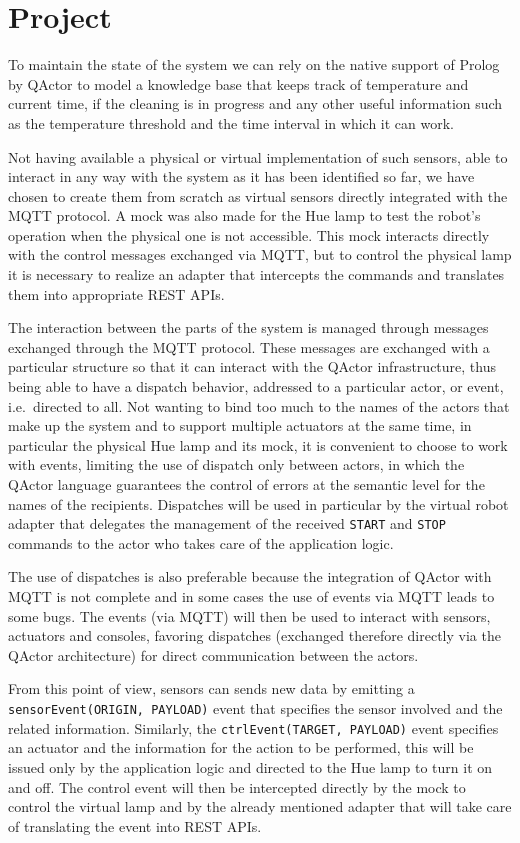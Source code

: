 \section{Project}
To maintain the state of the system we can rely on the native support of Prolog by QActor to model a knowledge base that keeps track of temperature and current time, if the cleaning is in progress and any other useful information such as the temperature threshold and the time interval in which it can work.

Not having available a physical or virtual implementation of such sensors, able to interact in any way with the system as it has been identified so far, we have chosen to create them from scratch as virtual sensors directly integrated with the MQTT protocol. A mock was also made for the Hue lamp to test the robot's operation when the physical one is not accessible. This mock interacts directly with the control messages exchanged via MQTT, but to control the physical lamp it is necessary to realize an adapter that intercepts the commands and translates them into appropriate REST APIs.

The interaction between the parts of the system is managed through messages exchanged through the MQTT protocol. These messages are exchanged with a particular structure so that it can interact with the QActor infrastructure, thus being able to have a dispatch behavior, addressed to a particular actor, or event, i.e.\ directed to all. Not wanting to bind too much to the names of the actors that make up the system and to support multiple actuators at the same time, in particular the physical Hue lamp and its mock, it is convenient to choose to work with events, limiting the use of dispatch only between actors, in which the QActor language guarantees the control of errors at the semantic level for the names of the recipients. Dispatches will be used in particular by the virtual robot adapter that delegates the management of the received \texttt{START} and \texttt{STOP} commands to the actor who takes care of the application logic.

The use of dispatches is also preferable because the integration of QActor with MQTT is not complete and in some cases the use of events via MQTT leads to some bugs. The events (via MQTT) will then be used to interact with sensors, actuators and consoles, favoring dispatches (exchanged therefore directly via the QActor architecture) for direct communication between the actors.

From this point of view, sensors can sends new data by emitting a \texttt{sensorEvent(ORIGIN, PAYLOAD)} event that specifies the sensor involved and the related information. Similarly, the \texttt{ctrlEvent(TARGET, PAYLOAD)} event specifies an actuator and the information for the action to be performed, this will be issued only by the application logic and directed to the Hue lamp to turn it on and off. The control event will then be intercepted directly by the mock to control the virtual lamp and by the already mentioned adapter that will take care of translating the event into REST APIs.

